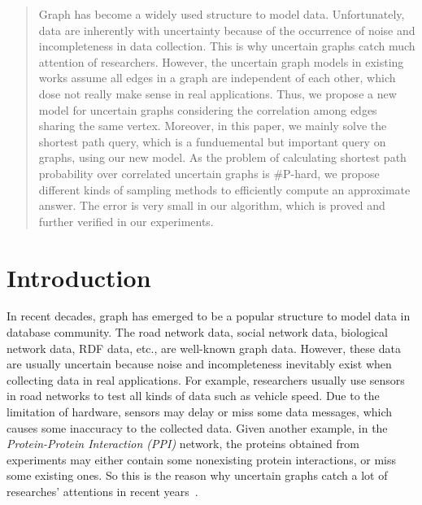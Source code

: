 \documentclass[runningheads,a4paper]{llncs}
\begin{document}
\begin{abstract}

Graph has become a widely used structure to model data. Unfortunately, data are inherently with uncertainty because of the occurrence of noise and incompleteness in data collection. This is why uncertain graphs catch much attention of researchers. However, the uncertain graph models in existing works assume all edges in a graph are independent of each other, which dose not really make sense in real applications. Thus, we propose a new model for uncertain graphs considering the correlation among edges sharing the same vertex. Moreover, in this paper, we mainly solve the shortest path query, which is a funduemental but important query on graphs, using our new model. As the problem of calculating shortest path probability over correlated uncertain graphs is \#P-hard, we propose different kinds of sampling methods to efficiently compute an approximate answer. The error is very small in our algorithm, which is proved and further verified in our experiments.

\end{abstract}


\section{Introduction}
\label{sec:intro}

\vspace{-0.3cm}

In recent decades, graph has emerged to be a popular structure to model data in database community. The road network data, social network data, biological network data, RDF data, etc., are well-known graph data. However, these data are usually uncertain because noise and incompleteness inevitably exist when collecting data in real applications. For example, researchers usually use sensors in road networks to test all kinds of data such as vehicle speed. Due to the limitation of hardware, sensors may delay or miss some data messages, which causes some inaccuracy to the collected data. Given another example, in the \emph{Protein-Protein Interaction (PPI)} network, the proteins obtained from experiments may either contain some nonexisting protein interactions, or miss some existing ones. So this is the reason why uncertain graphs catch a lot of researches' attentions in recent years~\cite{adar2007managing}\cite{asthana2004predicting}\cite{lian2011efficient}\cite{nierman2002protdb}.
\end{document}

